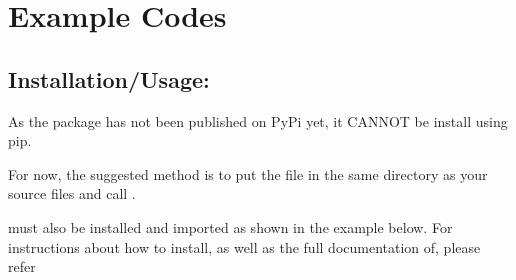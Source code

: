 \documentclass[letterpaper,10pt,english]{sphinxmanual}
\begin{document}
\chapter{Example Codes}
\label{\detokenize{examples:example-codes}}\label{\detokenize{examples::doc}}

\section{Installation/Usage:}
\label{\detokenize{examples:installation-usage}}
As the package has not been published on PyPi yet, it CANNOT be install using pip.

For now, the suggested method is to put the file  in the same directory as your source files and call .

 must also be installed and imported as shown in the example below.
For instructions about how to install, as well as the full documentation of,  please refer 
\end{document}
